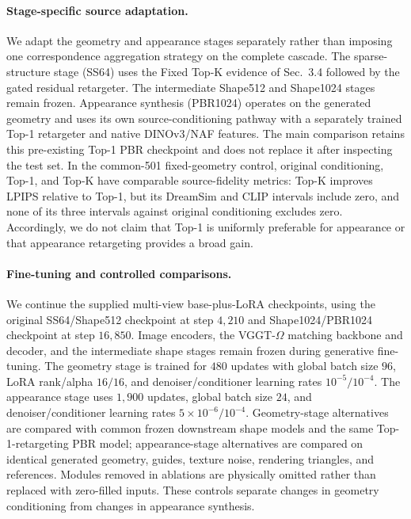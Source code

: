 \begin{appendix}
\paragraph{Stage-specific source adaptation.}
We adapt the geometry and appearance stages separately rather than imposing one correspondence aggregation strategy on the complete cascade.
The sparse-structure stage (SS64) uses the Fixed Top-K evidence of Sec.~3.4 followed by the gated residual retargeter.
The intermediate Shape512 and Shape1024 stages remain frozen.
Appearance synthesis (PBR1024) operates on the generated geometry and uses its own source-conditioning pathway with a separately trained Top-1 retargeter and native DINOv3/NAF features.
The main comparison retains this pre-existing Top-1 PBR checkpoint and does not replace it after inspecting the test set.
In the common-501 fixed-geometry control, original conditioning, Top-1, and Top-K have comparable source-fidelity metrics: Top-K improves LPIPS relative to Top-1, but its DreamSim and CLIP intervals include zero, and none of its three intervals against original conditioning excludes zero.
Accordingly, we do not claim that Top-1 is uniformly preferable for appearance or that appearance retargeting provides a broad gain.

\paragraph{Fine-tuning and controlled comparisons.}
We continue the supplied multi-view base-plus-LoRA checkpoints, using the original SS64/Shape512 checkpoint at step $4{,}210$ and Shape1024/PBR1024 checkpoint at step $16{,}850$.
Image encoders, the VGGT-$\Omega$ matching backbone and decoder, and the intermediate shape stages remain frozen during generative fine-tuning.
The geometry stage is trained for $480$ updates with global batch size $96$, LoRA rank/alpha $16/16$, and denoiser/conditioner learning rates $10^{-5}/10^{-4}$.
The appearance stage uses $1{,}900$ updates, global batch size $24$, and denoiser/conditioner learning rates $5\times10^{-6}/10^{-4}$.
Geometry-stage alternatives are compared with common frozen downstream shape models and the same Top-1-retargeting PBR model; appearance-stage alternatives are compared on identical generated geometry, guides, texture noise, rendering triangles, and references.
Modules removed in ablations are physically omitted rather than replaced with zero-filled inputs.
These controls separate changes in geometry conditioning from changes in appearance synthesis.


\end{appendix}
